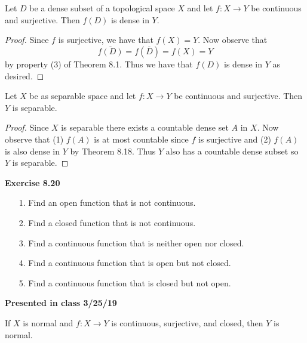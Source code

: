 \documentclass[letter,12pt,twoside]{hmcpset}
\begin{document}
\begin{problem}[Theorem 8.18]
    Let $D$ be a dense subset of a topological space $X$ and let $f:X
    \rightarrow Y$ be continuous and surjective. Then 
    $f(D)$ is dense in $Y$.
\end{problem}

\begin{proof}
    Since $f$ is surjective, we have that $f(X) = Y$. Now observe that
    \[
      \overline{f(D)} = f(\overline{D}) = f(X) = Y  
    \]
    by property (3) of Theorem 8.1. Thus we have that $f(D)$ is dense
    in $Y$ as desired.
\end{proof}

\begin{problem}[Corollary 8.19]
    Let $X$ be as separable space and let $f: X \rightarrow Y$ be
    continuous and surjective. Then $Y$ is separable.
\end{problem}

\begin{proof}
    Since $X$ is separable there exists a countable dense set $A$ in
    $X$. Now observe that (1) $f(A)$ is at most countable since $f$ is
    surjective and (2) $f(A)$ is also dense in $Y$ by Theorem 8.18.
    Thus $Y$ also has a countable dense subset so $Y$ is separable.
\end{proof}

\noindent
\textbf{Exercise 8.20}
\begin{itemize}
    \item[1.] Find an open function that is not continuous. 
    \item[2.] Find a closed function that is not continuous.
    \item[3.] Find a continuous function that is neither open nor closed.
    \item[4.] Find a continuous function that is open but not closed.
    \item[5.] Find a continuous function that is closed but not open. 
\end{itemize}

\noindent
\textbf{Presented in class 3/25/19}\\
\begin{problem}[Theorem 8.21]
    If $X$ is normal and $f: X \rightarrow Y$ is continuous,
    surjective, and closed, then $Y$ is normal.
\end{problem}
\end{document}
